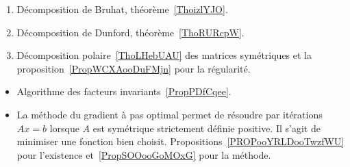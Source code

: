    \label{DECooWTAIooNkZAFg}
\begin{enumerate}
    \item
        Décomposition de Bruhat, théorème~\ref{ThoizlYJO}.
    \item
        Décomposition de Dunford, théorème~\ref{ThoRURcpW}.
    \item
        Décomposition polaire~\ref{ThoLHebUAU} des matrices symétriques et la proposition~\ref{PropWCXAooDuFMjn} pour la régularité.
\end{enumerate}


\begin{itemize}
    \item Algorithme des facteurs invariants~\ref{PropPDfCqee}.
    \item La méthode du gradient à pas optimal permet de résoudre par itérations \( Ax=b\) lorsque \( A\) est symétrique strictement définie positive. Il s'agit de minimiser une fonction bien choisit. Propositions~\ref{PROPooYRLDooTwzfWU} pour l'existence et~\ref{PropSOOooGoMOxG} pour la méthode.
\end{itemize}


